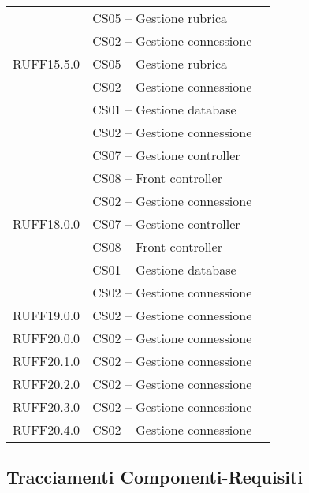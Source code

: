 \begin{center}
\begin{longtable}{lp{}l}
 & CS05 -- Gestione rubrica \\
 & CS02 -- Gestione connessione \\
RUFF15.5.0 & CS05 -- Gestione rubrica \\
 & CS02 -- Gestione connessione \\
 & CS01 -- Gestione database \\
 & CS02 -- Gestione connessione \\
 & CS07 -- Gestione controller \\
  & CS08 -- Front controller \\
 & CS02 -- Gestione connessione \\
RUFF18.0.0 & CS07 -- Gestione controller \\
 & CS08 -- Front controller \\
 & CS01 -- Gestione database \\
 & CS02 -- Gestione connessione \\
RUFF19.0.0 & CS02 -- Gestione connessione \\
RUFF20.0.0 & CS02 -- Gestione connessione \\
RUFF20.1.0 & CS02 -- Gestione connessione \\
RUFF20.2.0 & CS02 -- Gestione connessione \\
RUFF20.3.0 & CS02 -- Gestione connessione \\
RUFF20.4.0 & CS02 -- Gestione connessione \\
\bottomrule
\end{longtable}
\end{center}
\subsection{Tracciamenti Componenti-Requisiti}\label{sec:tracCompRec}

